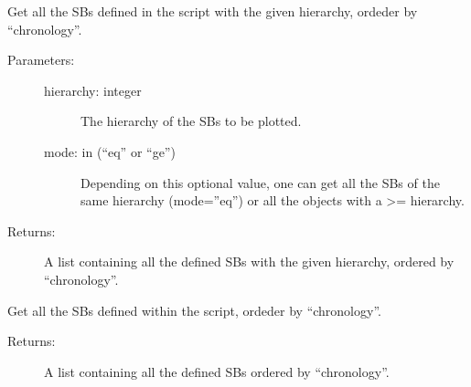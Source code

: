 \documentclass[letterpaper,10pt,english]{sphinxmanual}
\begin{document}

\begin{fulllineitems}
\label{\detokenize{hiegeo:hiegeo.get_sbobj_by_hie}}
Get all the SBs defined in the script with the given hierarchy,
ordeder by “chronology”.
\begin{description}
\item[{Parameters:}] \leavevmode\begin{description}
\item[{hierarchy: integer}] \leavevmode
The hierarchy of the SBs to be plotted.

\item[{mode: in (“eq” or “ge”)}] \leavevmode
Depending on this optional value, one can get all the SBs
of the same hierarchy (mode=”eq”) or all the objects with
a \textgreater{}= hierarchy.

\end{description}

\item[{Returns:}] \leavevmode
A list containing all the defined SBs with the given hierarchy, 
ordered by “chronology”.

\end{description}

\end{fulllineitems}


\begin{fulllineitems}
\label{\detokenize{hiegeo:hiegeo.get_sbobj_by_name}}
Get all the SBs defined within the script,
ordeder by “chronology”.
\begin{description}
\item[{Returns:}] \leavevmode
A list containing all the defined SBs ordered by “chronology”.

\end{description}

\end{fulllineitems}

\end{document}
